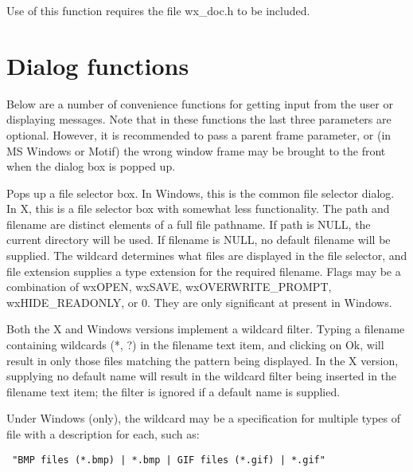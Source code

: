 Use of this function requires the file wx\_doc.h to be included.

\section{Dialog functions}\label{dialogfunctions}

Below are a number of convenience functions for getting input from the
user or displaying messages. Note that in these functions the last three
parameters are optional. However, it is recommended to pass a parent frame
parameter, or (in MS Windows or Motif) the wrong window frame may be brought to
the front when the dialog box is popped up.

\label{wxfileselector}


Pops up a file selector box. In Windows, this is the common file selector
dialog. In X, this is a file selector box with somewhat less functionality.
The path and filename are distinct elements of a full file pathname.
If path is NULL, the current directory will be used. If filename is NULL,
no default filename will be supplied. The wildcard determines what files
are displayed in the file selector, and file extension supplies a type
extension for the required filename. Flags may be a combination of wxOPEN,
wxSAVE, wxOVERWRITE\_PROMPT, wxHIDE\_READONLY, or 0. They are only significant
at present in Windows.

Both the X and Windows versions implement a wildcard filter. Typing a
filename containing wildcards (*, ?) in the filename text item, and
clicking on Ok, will result in only those files matching the pattern being
displayed. In the X version, supplying no default name will result in the
wildcard filter being inserted in the filename text item; the filter is
ignored if a default name is supplied.

Under Windows (only), the wildcard may be a specification for multiple
types of file with a description for each, such as:

\begin{verbatim}
 "BMP files (*.bmp) | *.bmp | GIF files (*.gif) | *.gif"
\end{verbatim}

